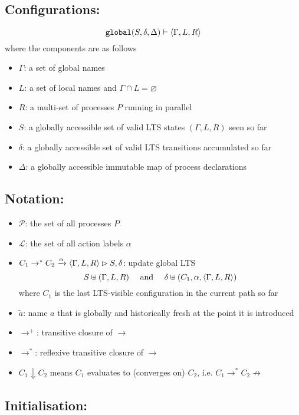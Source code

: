 \documentclass[envcountsame,runningheads,orivec]{llncs}
\begin{document}
\subsection{Configurations:}
\[
\texttt{global}(S,\delta,\Delta) \vdash \langle \Gamma,L,R \rangle
\]
where the components are as follows
\begin{itemize}
\item $\Gamma$: a set of global names
\item $L$: a set of local names and $\Gamma \cap L = \varnothing$
\item $R$: a multi-set of processes $P$ running in parallel
\item $S$: a globally accessible set of valid LTS states $(\Gamma,L,R)$ seen so far
\item $\delta$: a globally accessible set of valid LTS transitions accumulated so far
\item $\Delta$: a globally accessible immutable map of process declarations
\end{itemize}

\subsection{Notation:}
\begin{itemize}
\item $\mathcal{P}$: the set of all processes $P$
\item $\mathcal{L}$: the set of all action labels $\alpha$
\item $C_1 \to^* C_2 \xrightarrow{\alpha} \langle \Gamma,L,R \rangle\rhd S,\delta$: update global LTS
\[S \uplus (\Gamma,L,R) \quad \text{ and } \quad \delta \uplus (C_1,\alpha,\langle \Gamma,L,R \rangle)\]
where $C_1$ is the last LTS-visible configuration in the current path so far
\item $\tilde{a}$: name $a$ that is globally and historically fresh at the point it is introduced
\item $\to^+$: transitive closure of $\to$
\item $\to^*$: reflexive transitive closure of $\to$
\item $C_1 \Downarrow C_2$ means $C_1$ evaluates to (converges on) $C_2$, i.e. $C_1 \to^* C_2 \not\to$
\end{itemize}

\subsection{Initialisation:}
\end{document}
